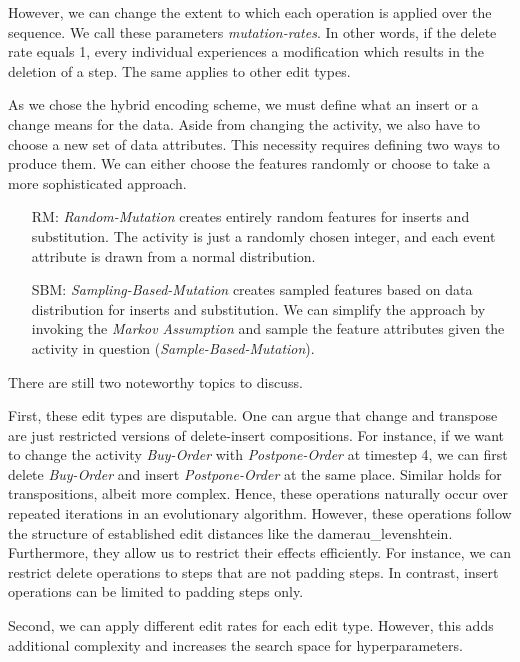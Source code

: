 \documentclass[./../../paper.tex]{subfiles}
\begin{document}
However, we can change the extent to which each operation is applied over the sequence. We call these parameters \emph{mutation-rates}. In other words, if the delete rate equals 1, every individual experiences a modification which results in the deletion of a step. The same applies to other edit types.

As we chose the hybrid encoding scheme, we must define what an insert or a change means for the data. Aside from changing the activity, we also have to choose a new set of data attributes. This necessity requires defining two ways to produce them. We can either choose the features randomly or choose to take a more sophisticated approach.

\begin{enumerate}
    \item[RM:] \emph{Random-Mutation} creates entirely random features for inserts and substitution. The activity is just a randomly chosen integer, and each event attribute is drawn from a normal distribution.
    \item[SBM:] \emph{Sampling-Based-Mutation} creates sampled features based on data distribution for inserts and substitution. We can simplify the approach by invoking the \emph{Markov Assumption} and sample the feature attributes given the activity in question (\emph{Sample-Based-Mutation}).

\end{enumerate}

There are still two noteworthy topics to discuss.

First, these edit types are disputable. One can argue that change and transpose are just restricted versions of delete-insert compositions. For instance, if we want to change the activity \emph{Buy-Order} with \emph{Postpone-Order} at timestep 4, we can first delete \emph{Buy-Order} and insert \emph{Postpone-Order} at the same place. Similar holds for transpositions, albeit more complex. Hence, these operations naturally occur over repeated iterations in an evolutionary algorithm. However, these operations follow the structure of established edit distances like the \gls{damerau_levenshtein}.
Furthermore, they allow us to restrict their effects efficiently. For instance, we can restrict delete operations to steps that are not padding steps. In contrast, insert operations can be limited to padding steps only.

Second, we can apply different edit rates for each edit type. However, this adds additional complexity and increases the search space for hyperparameters.
\end{document}
